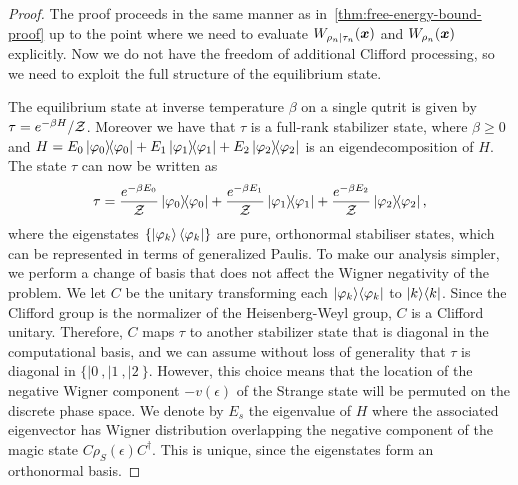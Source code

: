 \documentclass[pra,
aps,
twocolumn,
superscriptaddress,
groupedaddress,
nofootinbib,
reprint
]{revtex4-1}
\begin{document}
\begin{proof}
The proof proceeds in the same manner as in~\cref{thm:free-energy-bound-proof} up to the point where we need to evaluate $W_{\rho_n |\tau_n} (\boldsymbol{x})$ and $W_{\rho_n}(\boldsymbol{x})$ explicitly.
Now we do not have the freedom of additional Clifford processing, so we need to exploit the full structure of the equilibrium state.

The equilibrium state at inverse temperature $\beta$ on a single qutrit is given by $\tau = e^{-\beta H} / \mathcal{Z}$. Moreover we have that $\tau$ is a full-rank stabilizer state, where $\beta \geq 0$ and $H = E_0 \ketbra{\varphi_0} + E_1 \ketbra{\varphi_1} + E_2 \ketbra{\varphi_2}$ is an eigendecomposition of $H$.
The state $\tau$ can now be written as 
\begin{equation}
	\tau = \frac{e^{-\beta E_0}}{\mathcal{Z}} \ketbra{\varphi_0} + \frac{e^{-\beta E_1}}{\mathcal{Z}} \ketbra{\varphi_1} + \frac{e^{-\beta E_2}}{\mathcal{Z}} \ketbra{\varphi_2},
\end{equation}
where the eigenstates $\{\ket{\varphi_k}\langle\varphi_k|\}$ are pure, orthonormal stabiliser states, which can be represented in terms of generalized Paulis. To make our analysis simpler, we perform a change of basis that does not affect the Wigner negativity of the problem. We let $C$ be the unitary transforming each $|\varphi_k\rangle\langle\varphi_k|$ to $|k\rangle\langle k|$. Since the Clifford group is the normalizer of the Heisenberg-Weyl group, $C$ is a Clifford unitary. Therefore, $C$ maps $\tau$ to another stabilizer state that is diagonal in the computational basis, and we can assume without loss of generality that $\tau$ is diagonal in $\{|0\>,|1\>, |2\>\}$. However, this choice means that the location of the negative Wigner component $-v(\epsilon)$ of the Strange state will be permuted on the discrete phase space. We denote by $E_s$ the eigenvalue of $H$ where the associated eigenvector has Wigner distribution overlapping the negative component of the magic state $C\rho_S(\epsilon)C^\dagger$.  This is unique, since the eigenstates form an orthonormal basis.


\end{proof}
\end{document}

